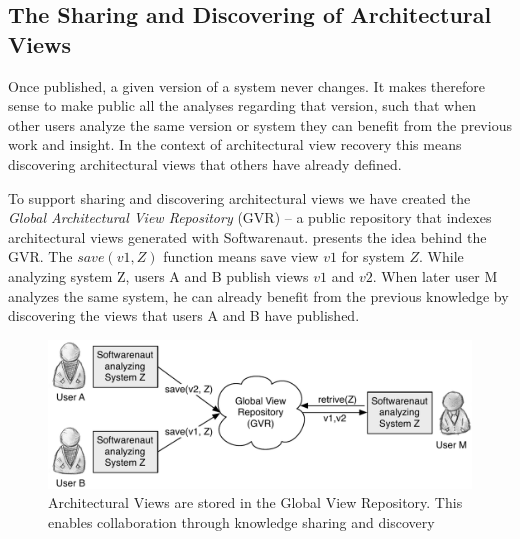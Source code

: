 \documentclass[preprint,12pt]{elsarticle}
\begin{document}





\subsection {The Sharing and Discovering of Architectural Views}
Once published, a given version of a system never changes. It makes therefore sense to make public all the analyses regarding that version, such that when other users analyze the same version or system they can benefit from the previous work and insight. In the context of architectural view recovery this means discovering architectural views that others have already defined. 


To support sharing and discovering architectural views we have created the {\em Global Architectural View Repository} (GVR) -- a public repository that indexes architectural views generated with Softwarenaut.  presents the idea behind the GVR. The $save(v1,Z)$ function means save view $v1$ for system $Z$. While analyzing system Z, users A and B publish views $v1$ and $v2$. When later user M analyzes the same system, he can already benefit from the previous knowledge by discovering the views that users A and B have published. 



\begin{figure}[h]
\begin{center}
\includegraphics[width=0.9\linewidth]{images/CollaborationConcept}
\caption{Architectural Views are stored in the Global View Repository. This enables collaboration through knowledge sharing and discovery}
\end{center}
\end{figure}
\end{document}

